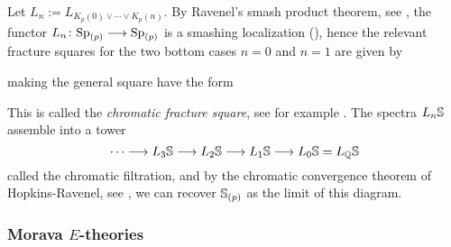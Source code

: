 Let $L_n := L_{K_p(0)\vee \cdots \vee K_p(n)}$. By Ravenel's smash product theorem, see \cite[7.5.6]{ravenel_92}, the functor $L_n\colon \sp_{(p)}\longrightarrow \sp_{(p)}$ is a smashing localization (\crefme), hence the relevant fracture squares for the two bottom cases $n=0$ and $n=1$ are given by
\begin{center}
\end{center}
making the general square have the form
\begin{center}
\end{center}
This is called the \emph{chromatic fracture square}, see for example \cite[4.3]{hovey_95}. The spectra $L_n\S$ assemble into a tower 
$$\cdots \longrightarrow L_3\S \longrightarrow L_2\S \longrightarrow L_1\S \longrightarrow L_0 \S = L_\Q\S$$
called the chromatic filtration, and by the chromatic convergence theorem of Hopkins-Ravenel, see \cite[7.5.7]{ravenel_92}, we can recover $\S_{(p)}$ as the limit of this diagram. 









\subsubsection{Morava \texorpdfstring{$E$}{E}-theories}
\label{ch1:sssec:morava-E-theories}

